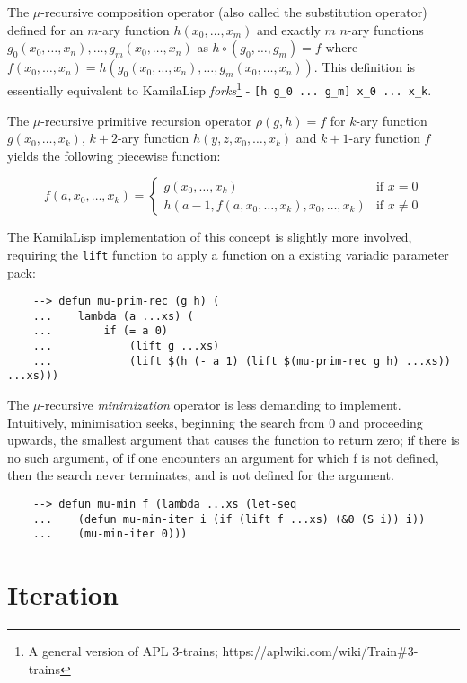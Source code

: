 The $\mu$-recursive composition operator (also called the substitution operator) defined for an $m$-ary function $h(x_0, \dots, x_m)$ and exactly $m$ $n$-ary functions $g_0(x_0, \dots, x_n), \dots, g_m(x_0, \dots, x_n)$ as $h\circ(g_0, \dots, g_m) = f$ where $f(x_0, \dots, x_n) = h(g_0(x_0, \dots, x_n), \dots, g_m(x_0, \dots, x_n))$. This definition is essentially equivalent to KamilaLisp \textit{forks}\footnote{A general version of APL 3-trains; https://aplwiki.com/wiki/Train\#3-trains} - \verb|[h g_0 ... g_m] x_0 ... x_k|.

The $\mu$-recursive primitive recursion operator $\rho(g,h)=f$ for $k$-ary function $g(x_0,\dots,x_k)$, $k+2$-ary function $h(y,z,x_0,\dots,x_k)$ and $k+1$-ary function $f$ yields the following piecewise function:

\begin{equation*}
f(a,x_0,\dots,x_k)=
    \begin{cases}
        g(x_0,\dots,x_k) & \text{if } x = 0\\
        h(a-1,f(a,x_0,\dots,x_k),x_0,\dots,x_k) & \text{if } x \ne 0
    \end{cases}
\end{equation*}

The KamilaLisp implementation of this concept is slightly more involved, requiring the \verb|lift| function to apply a function on a existing variadic parameter pack:

\begin{Verbatim}
    --> defun mu-prim-rec (g h) (
    ...    lambda (a ...xs) (
    ...        if (= a 0)
    ...            (lift g ...xs)
    ...            (lift $(h (- a 1) (lift $(mu-prim-rec g h) ...xs)) ...xs)))
\end{Verbatim}

The $\mu$-recursive \textit{minimization} operator is less demanding to implement. Intuitively, minimisation seeks, beginning the search from 0 and proceeding upwards, the smallest argument that causes the function to return zero; if there is no such argument, of if one encounters an argument for which f is not defined, then the search never terminates, and is not defined for the argument.

\begin{Verbatim}
    --> defun mu-min f (lambda ...xs (let-seq
    ...    (defun mu-min-iter i (if (lift f ...xs) (&0 (S i)) i))
    ...    (mu-min-iter 0)))
\end{Verbatim}

\section{Iteration}

